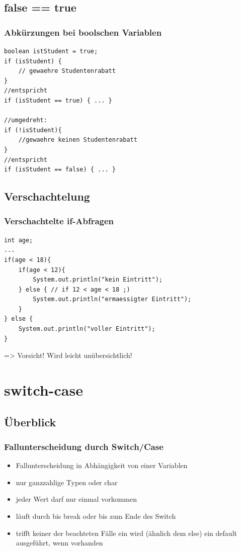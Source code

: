 \documentclass[final]{beamer}
\begin{document}
\subsection{false == true}
\begin{frame}[containsverbatim]
	\frametitle{Abkürzungen bei boolschen Variablen}
	\begin{lstlisting}
boolean istStudent = true;
if (isStudent) {
	// gewaehre Studentenrabatt
}
//entspricht
if (isStudent == true) { ... }

//umgedreht:
if (!isStudent){
	//gewaehre keinen Studentenrabatt
}
//entspricht
if (isStudent == false) { ... }
	\end{lstlisting}
\end{frame}

\subsection{Verschachtelung}
\begin{frame}[containsverbatim]
	\frametitle{Verschachtelte if-Abfragen}
	\begin{lstlisting}
int age;
...
if(age < 18){
	if(age < 12){
		System.out.println("kein Eintritt");
	} else { // if 12 < age < 18 ;)
		System.out.println("ermaessigter Eintritt");
	}
} else {
	System.out.println("voller Eintritt");
}
	\end{lstlisting}
	=> Vorsicht! Wird leicht unübersichtlich!
\end{frame}

\section{switch-case}
\subsection{Überblick}
\begin{frame}[containsverbatim]
	\frametitle{Fallunterscheidung durch Switch/Case}
	\begin{itemize}
		\item{Fallunterscheidung in Abhängigkeit von einer Variablen}
		\item{nur ganzzahlige Typen oder char}
		\item{jeder Wert darf nur einmal vorkommen}
		\item{läuft durch bis break oder bis zum Ende des Switch}
		\item{trifft keiner der beachteten Fälle ein wird (ähnlich dem else) ein default ausgeführt, wenn vorhanden}
	\end{itemize}
\end{frame}
\end{document}

